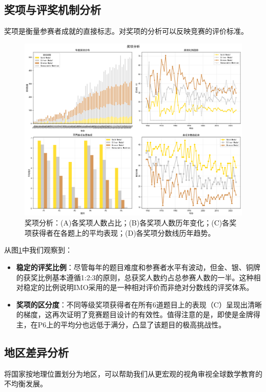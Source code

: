 \documentclass[12pt,a4paper]{article}
\begin{document}
\subsection{奖项与评奖机制分析}
奖项是衡量参赛者成就的直接标志。对奖项的分析可以反映竞赛的评价标准。

\begin{figure}[H]
    \centering
    \includegraphics[width=\textwidth]{award_analysis.png}
    \caption{奖项分析：(A)各奖项人数占比；(B)各奖项人数历年变化；(C)各奖项获得者在各题上的平均表现；(D)各奖项分数线历年趋势。}
    \label{fig:award_analysis}
\end{figure}

从图\ref{fig:award_analysis}中我们观察到：
\begin{itemize}
    \item \textbf{稳定的评奖比例}：尽管每年的题目难度和参赛者水平有波动，但金、银、铜牌的获奖比例基本遵循1:2:3的原则，总获奖人数约占总参赛人数的一半。这种相对稳定的比例说明IMO采用的是一种相对评价而非绝对分数线的评奖体系。
    \item \textbf{奖项的区分度}：不同等级奖项获得者在所有6道题目上的表现（C）呈现出清晰的梯度，这再次证明了竞赛题目设计的有效性。值得注意的是，即使是金牌得主，在P6上的平均分也远低于满分，凸显了该题目的极高挑战性。
\end{itemize}

\subsection{地区差异分析}
将国家按地理位置划分为地区，可以帮助我们从更宏观的视角审视全球数学教育的不均衡发展。
\end{document}
